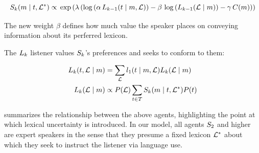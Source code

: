 \begin{definition}[$\SpeakerK$]\label{def:l1}
  \[
  \SpeakerK(\msg \given \state, \LexStar) 
  \propto \\
  \exp
  \left(
    \lambda
    \left(
      \log
      \left(
        \alpha 
        \,
        \ListenerK[k-1](\state \given \msg, \Lex)
      \right)
      - 
      \beta 
      \, 
      \log\left(\ListenerK[k-1](\Lex\given\msg)\right)
      -
      \gamma \, \Costs(\msg)
     \right)
  \right)
  \]
\end{definition}

The new weight $\beta$ defines how much value the speaker places on
conveying information about its perferred lexicon.

The $\ListenerK$ listener values $\SpeakerK$'s preferences and seeks
to conform to them:

\begin{definition}[$\ListenerK$]\label{def:l1}
  \begin{align*}
  \ListenerK(\state, \Lex \given \msg) 
  &= 
  \sum_{\Lex} \listenerOne(\state \given \msg, \Lex) \ListenerK(\Lex \given \msg) 
  \\
  \ListenerK(\Lex \given \msg) &\propto \Prior(\Lex) \sum_{\state\in\States} \SpeakerK(\msg \given \state, \LexStar)\Prior(\state)
  \end{align*}
\end{definition}

 summarizes the relationship between the above
agents, highlighting the point at which lexical uncertainty is
introduced. In our model, all agents $\SpeakerK[2]$ and higher are
expert speakers in the sense that they presume a fixed lexicon
$\LexStar$ about which they seek to instruct the listener via language
use.

